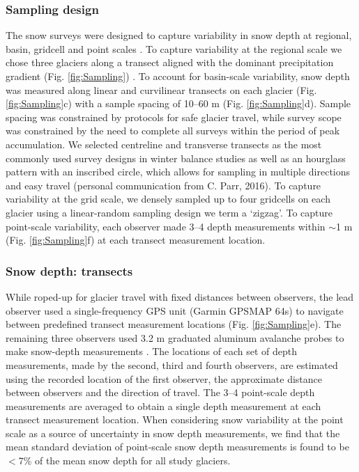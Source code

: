 \documentclass[twocolumn, letterpaper]{igs}
\begin{document}
\subsubsection{Sampling design}

The snow surveys were designed to capture variability in snow depth at regional, basin, gridcell and point scales \citep{Clark2011}. To capture variability at the regional scale we chose three glaciers along a transect aligned with the dominant precipitation gradient  (Fig. \ref{fig:Sampling}) \citep{Taylor1969}. To account for basin-scale variability, snow depth was measured along linear and curvilinear transects on each glacier (Fig. \ref{fig:Sampling}c) with a sample spacing of 10--60 m (Fig. \ref{fig:Sampling}d). Sample spacing was constrained by protocols for safe glacier travel, while survey scope was constrained by the need to complete all surveys within the period of peak accumulation. We selected centreline and transverse transects as the most commonly used survey designs in winter balance studies \citep[e.g.][]{Kaser2003, Machguth2006} as well as an hourglass pattern with an inscribed circle, which allows for sampling in multiple directions and easy travel (personal communication from C. Parr, 2016). To capture variability at the grid scale, we densely sampled up to four gridcells on each glacier using a linear-random sampling design \citep{Shea2010} we term a `zigzag'. To capture point-scale variability, each observer made 3--4 depth measurements within $\sim$1 m (Fig. \ref{fig:Sampling}f) at each transect measurement location. 

\subsubsection{Snow depth: transects}

While roped-up for glacier travel with fixed distances between observers, the lead observer used a single-frequency GPS unit (Garmin GPSMAP 64s) to navigate between predefined transect measurement locations (Fig. \ref{fig:Sampling}e). The remaining three observers used 3.2 m graduated aluminum avalanche probes to make snow-depth measurements \citep{Kinar2015}. The locations of each set of depth measurements, made by the second, third and fourth observers, are estimated using the recorded location of the first observer, the approximate distance between observers and the direction of travel. The 3--4 point-scale depth measurements are averaged to obtain a single depth measurement at each transect measurement location. When considering snow variability at the point scale as a source of uncertainty in snow depth measurements, we find that the mean standard deviation of point-scale snow depth measurements is found to be $<$7\% of the mean snow depth for all study glaciers.
\end{document}
